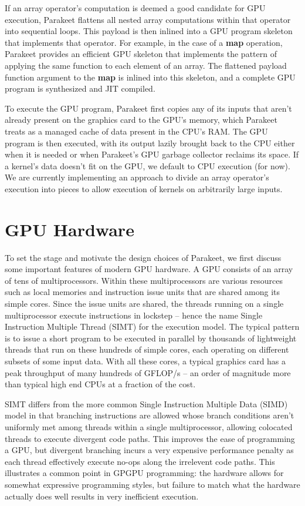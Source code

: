 \documentclass[preprint]{sigplanconf}
\begin{document}
If an array operator's computation is deemed a good candidate for GPU execution, Parakeet flattens all nested array computations within that operator into sequential loops.  This payload is then inlined into a GPU program skeleton that implements that operator.  For example, in the case of a \textbf{map} operation, Parakeet provides an efficient GPU skeleton that implements the pattern of applying the same function to each element of an array.  The flattened payload function argument to the \textbf{map} is inlined into this skeleton, and a complete GPU program is synthesized and JIT compiled.

To execute the GPU program, Parakeet first copies any of its inputs that aren't already present on the graphics card to the GPU's memory, which Parakeet treats as a managed cache of data present in the CPU's RAM.  The GPU program is then executed, with its output lazily brought back to the CPU either when it is needed or when Parakeet's GPU garbage collector reclaims its space. If a kernel's data doesn't fit on the GPU, we default to CPU execution (for now).  We are currently implementing an approach to divide an array operator's execution into pieces to allow execution of kernels on arbitrarily large inputs.

\section{GPU Hardware}
To set the stage and motivate the design choices of Parakeet, we first discuss some important features of modern GPU hardware.  A GPU consists of an array of tens of multiprocessors.  Within these multiprocessors are various resources such as local memories and instruction issue units that are shared among its simple cores. Since the issue units are shared, the threads running on a single multiprocessor execute instructions in lockstep -- hence the name Single Instruction Multiple Thread (SIMT) for the execution model.  The typical pattern is to issue a short program to be executed in parallel by thousands of lightweight threads that run on these hundreds of simple cores, each operating on different subsets of some input data.  With all these cores, a typical graphics card has a peak throughput of many hundreds of GFLOP/s -- an order of magnitude more than typical high end CPUs at a fraction of the cost.

SIMT differs from the more common Single Instruction Multiple Data (SIMD) model in that branching instructions are allowed whose branch conditions aren't uniformly met among threads within a single multiprocessor, allowing colocated threads to execute divergent code paths.  This improves the ease of programming a GPU, but divergent branching incurs a very expensive performance penalty as each thread effectively execute no-ops along the irrelevent code paths.  This illustrates a common point in GPGPU programming: the hardware allows for somewhat expressive programming styles, but failure to match what the hardware actually does well results in very inefficient execution.
\end{document}
